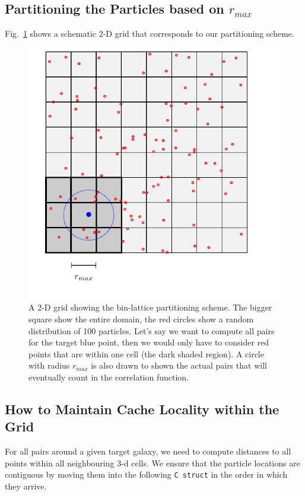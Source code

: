 \documentclass[preprint,authoryear,12pt]{elsarticle}
\newcommand{\rmax}{\ensuremath{{r_{max}}}\xspace}
\begin{document}
\subsection{Partitioning the Particles based on \rmax}
Fig.~\ref{fig:grid} shows a schematic 2-D grid that corresponds to our partitioning scheme.
\begin{figure}[htbp]
\centering
\includegraphics[clip=true]{tikz_grid}
\caption{A 2-D grid showing the bin-lattice partitioning scheme. The bigger square show the entire 
domain, the red circles show a random distribution of 100 particles. Let's say we want to compute all pairs 
for the target blue point, then we would only have to consider red points that are within one cell (the dark shaded region). 
A circle with radius \rmax is also drawn to shown the actual pairs that will eventually count in the correlation function.} 
\label{fig:grid}
\end{figure}


\subsection{How to Maintain Cache Locality within the Grid}
For all pairs around a given target galaxy, we need to compute distances to all points within all neighbouring 3-d cells. 
We ensure that the particle locations are contiguous by moving them into the following \texttt{C struct} in the order in which they arrive. 
\end{document}
